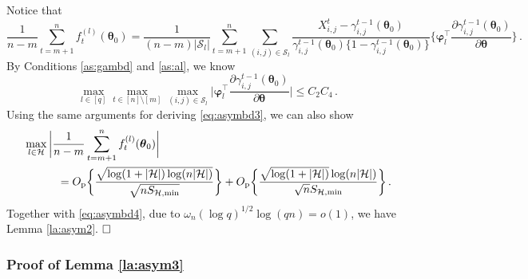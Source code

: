 \documentclass[12pt]{article}
\newcommand{\btheta}{\boldsymbol \theta}
\newcommand{\bvarphi}{\boldsymbol \varphi}
\def\T{{\scriptscriptstyle \top} }
\newcommand{\0}{{\bf 0}}
\begin{document}
Notice that
\[
\frac{1}{n-m}\sum_{t=m+1}^nf_t^{(l)}(\btheta_0)=\frac{1}{(n-m)|\mathcal{S}_l|}\sum_{t=m+1}^n\sum_{(i,j)\in\mathcal{S}_l}\frac{X_{i,j}^t-\gamma_{i,j}^{t-1}(\btheta_0)}{\gamma_{i,j}^{t-1}(\btheta_0)\{1-\gamma_{i,j}^{t-1}(\btheta_0)\}}\bigg\{\bvarphi_l^{\T}\frac{\partial\gamma_{i,j}^{t-1}(\btheta_0)}{\partial\btheta}\bigg\}\,.
\]
By Conditions \ref{as:gambd} and \ref{as:al}, we know
\[
\max_{l\in[q]}\max_{t\in[n]\setminus[m]}\max_{(i,j)\in\mathcal{S}_l}\bigg|\bvarphi_l^{\T}\frac{\partial\gamma_{i,j}^{t-1}(\btheta_0)}{\partial\btheta}\bigg|\leq C_2C_4\,.
\]
Using the same arguments for deriving \eqref{eq:asymbd3}, we can also show
\begin{align*}
&\max_{l\in\mathcal{H}}\bigg|\frac{1}{n-m}\sum_{t=m+1}^nf_t^{(l)}(\btheta_0)\bigg|\\
&~~~~~~~~~=O_{\rm p}\bigg\{\frac{\sqrt{\log(1+|\mathcal{H}|)\log(n|\mathcal{H}|)}}{\sqrt{nS_{\mathcal{H},\min}}}\bigg\}+O_{\rm p}\bigg\{\frac{\sqrt{\log(1+|\mathcal{H}|)}\log(n|\mathcal{H}|)}{\sqrt{n}S_{\mathcal{H},\min}}\bigg\}\,.
\end{align*}
Together with \eqref{eq:asymbd4}, due to $\omega_n(\log q)^{1/2}\log(qn)=o(1)$, we have Lemma \ref{la:asym2}. $\hfill\Box$

\subsubsection{Proof of Lemma \ref{la:asym3}}\label{pf:laasymp3}
\end{document}
